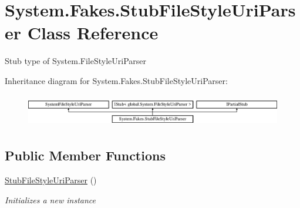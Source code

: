 \hypertarget{class_system_1_1_fakes_1_1_stub_file_style_uri_parser}{\section{System.\-Fakes.\-Stub\-File\-Style\-Uri\-Parser Class Reference}
\label{class_system_1_1_fakes_1_1_stub_file_style_uri_parser}
}


Stub type of System.\-File\-Style\-Uri\-Parser 


Inheritance diagram for System.\-Fakes.\-Stub\-File\-Style\-Uri\-Parser\-:\begin{figure}[H]
\begin{center}
\leavevmode
\includegraphics[height=1.452659cm]{class_system_1_1_fakes_1_1_stub_file_style_uri_parser}
\end{center}
\end{figure}
\subsection*{Public Member Functions}
\begin{DoxyCompactItemize}
\item 
\hyperlink{class_system_1_1_fakes_1_1_stub_file_style_uri_parser_af35ff70bf2b3dafa97c3f81c57bd1391}{Stub\-File\-Style\-Uri\-Parser} ()
\begin{DoxyCompactList}\small\item\em Initializes a new instance\end{DoxyCompactList}\end{DoxyCompactItemize}
